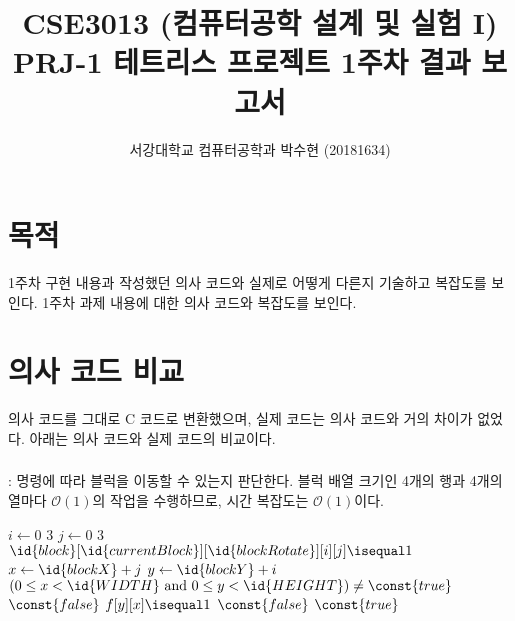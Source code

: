 
	


\title{CSE3013 (컴퓨터공학 설계 및 실험 I) \space \newline PRJ-1 테트리스 프로젝트 1주차 결과 보고서}
\author{서강대학교 컴퓨터공학과 박수현 (20181634)}
\maketitle

\section{목적}
1주차 구현 내용과 작성했던 의사 코드와 실제로 어떻게 다른지 기술하고 복잡도를 보인다. 1주차 과제 내용에 대한 의사 코드와 복잡도를 보인다. 

\section{의사 코드 비교}
의사 코드를 그대로 C 코드로 변환했으며, 실제 코드는 의사 코드와 거의 차이가 없었다. 아래는 의사 코드와 실제 코드의 비교이다.

\subsubsection{}: 명령에 따라 블럭을 이동할 수 있는지 판단한다.
블럭 배열 크기인 4개의 행과 4개의 열마다 $\mathcal{O}\left(1\right)$의 작업을 수행하므로, 시간 복잡도는 $\mathcal{O}\left(1\right)$이다.

\begin{codebox}
\li \For $i \gets 0$ \To $3$
\li \Do
        \For $j \gets 0$ \To $3$
\li     \Do
            \If $\id{block}[\id{currentBlock}][\id{blockRotate}][i][j] \isequal 1$
\li         \Then
                $x \gets \id{blockX} + j$
\li             $y \gets \id{blockY} + i$
\li             \If $\left( 0 \leq x < \id{WIDTH} \mbox{ and } 0 \leq y < \id{HEIGHT} \right) \neq \const{true}$
\li                 \Then \Return $\const{false}$
                \End
\li             \If $f[y][x] \isequal 1$
\li                 \Then \Return $\const{false}$
                \End
            \End
        \End
    \End
\li \Return $\const{true}$
\end{codebox}

\inputminted[xleftmargin=\parindent,linenos,firstline=246,lastline=261]{c}{inc-sources/tetris-week09-experiment.c}

